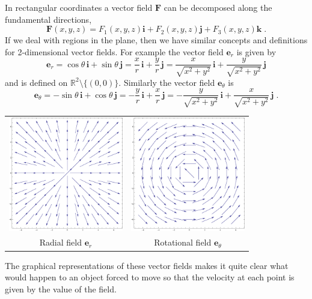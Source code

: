 In rectangular coordinates a vector field $\textbf{F}$ can
be decomposed along the fundamental directions,
%
$$\textbf{F}(x,y,z) = F_1(x,y,z) \textbf{i} + F_2(x,y,z) \textbf{j} + F_3(x,y,z) \textbf{k} \; .$$
%
If we deal with regions in the plane, then we have similar
concepts and definitions for 2-dimensional vector fields.
For example the vector field $\textbf{e}_r$ is given by
%
$$\textbf{e}_r = \cos\theta\, \textbf{i} +
\sin\theta \,\textbf{j} = \frac{x}{r} \, \textbf{i} +
\frac{y}{r} \, \textbf{j} = \frac{x}{\sqrt{x^2+y^2}} \,
\textbf{i} + \frac{y}{\sqrt{x^2+y^2}} \, \textbf{j}$$
%
and is defined on $\mathbb{R}^2 \setminus \{ (0,0)\}$.
Similarly the vector field $\textbf{e}_{\theta}$ is
%
$$\textbf{e}_\theta = -\sin\theta\, \textbf{i} +
\cos\theta \,\textbf{j} = -\frac{y}{r} \, \textbf{i} +
\frac{x}{r} \, \textbf{j} = -\frac{y}{\sqrt{x^2+y^2}} \,
\textbf{i} + \frac{x}{\sqrt{x^2+y^2}} \, \textbf{j} \; .$$
%
 \begin{center}
\begin{tabular}{cc}
  \includegraphics[height=5cm]{../images/radial_field.eps}
  &
  \includegraphics[height=5cm]{../images/rotational_field.eps}
  \\
  Radial field $\textbf{e}_r$ & Rotational field
  $\textbf{e}_\theta$
\end{tabular}
\end{center}

The graphical representations of these vector fields makes
it quite clear what would happen to an object forced to move
so that the velocity at each point is given by the value of
the field.

